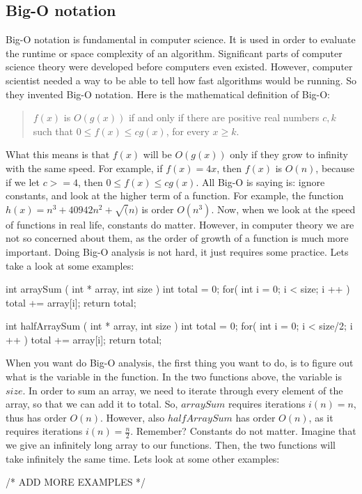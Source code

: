 \documentclass[../notebook.tex]{subfiles}
\begin{document}
\subsection{ Big-O notation } %
\label{sub:subsection name}
Big-O notation is fundamental in computer science. It is used in order to evaluate the runtime or space complexity of an algorithm. Significant parts of computer science theory were developed before computers even existed. However, computer scientist needed a way to be able to tell how fast algorithms would be running. So they invented Big-O notation. Here is the mathematical definition of Big-O: \\
\begin{quote}
  $f(x)$ is $O(g(x))$ if and only if there are positive real numbers $c,k$ such that $0\leq f(x) \leq cg(x)$, for every $x\geq k$.\\
\end{quote}
What this means is that $f(x)$ will be $O(g(x))$ only if they grow to infinity with the same speed. For example, if $f(x) = 4x$, then $f(x)$ is $O(n)$, because if we let $c>=4$, then  
$0\leq f(x) \leq cg(x)$. All Big-O is saying is: ignore constants, and look at the higher term of a function. For example, the function $h(x) = n^3 + 40942 n^2 + \sqrt( n )$ is order $O(n^3)$. Now, when we look at the speed of functions in real life, constants do matter. However, in computer theory we are not so concerned about them, as the order of growth of a function is much more important. Doing Big-O analysis is not hard, it just requires some practice. Lets take a look at some examples:
\begin{cppcode}
  int arraySum ( int * array, int size )
  {
    int total = 0;
    for( int i = 0; i < size; i ++ )
      total += array[i];
    return total;
  }

  int halfArraySum ( int * array, int size )
  {
    int total = 0;
    for( int i = 0; i < size/2; i ++ )
      total += array[i];
    return total;
  }
\end{cppcode}
When you want do Big-O analysis, the first thing you want to do, is to figure out what is the variable in the function. In the two functions above, the variable is $size$. In order to sum an array, we need to iterate through every element of the array, so that we can add it to total. So, $arraySum$ requires iterations $i(n)=n$, thus has order $O(n)$. However, also $halfArraySum$ has order $O(n)$, as it requires iterations $i(n)=\frac{n}{2}$. Remember? Constants do not matter. Imagine that we give an infinitely long array to our functions. Then, the two functions will take infinitely the same time. Lets look at some other examples:
\begin{cppcode}
  /* ADD MORE EXAMPLES */
\end{cppcode}
\end{document}
